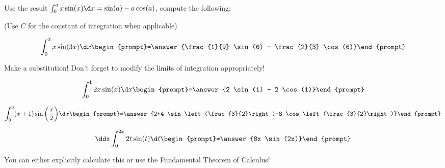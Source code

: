 \documentclass{ximera}
\author{Jim Talamo}
\begin{document}
\begin{exercise}
Use the result $ \int_0^a x \sin(x) \d x = \sin(a)-a \cos(a)$, compute the following:

\begin{prompt} (Use $C$ for the constant of integration when applicable) \end{prompt}

\[
 \int_0^2 x \sin(3x) \d x \begin{prompt}=\answer{\frac{1}{9} \sin(6) -
    \frac{2}{3} \cos(6)}\end{prompt}
\]

\begin{hint}
Make a substitution!  Don't forget to modify the limits of integration appropriately!
\end{hint}

\[
 \int_0^1 2x \sin(x) \d x \begin{prompt}=\answer{2 \sin(1) - 2 \cos(1)}\end{prompt}
\]

\[
 \int_0^3 (x+1) \sin\bigg(\frac{x}{2}\bigg) \d x \begin{prompt}=\answer{2+4 \sin\left(\frac{3}{2}\right)-8 \cos\left(\frac{3}{2}\right)}\end{prompt}
 \]

\[
\ddx  \int_0^{2x} 2t \sin(t) \d t  \begin{prompt}=\answer{8x \sin(2x)}\end{prompt}
\]
\begin{hint}
You can either explicitly calculate this or use the Fundamental Theorem of Calculus!
\end{hint}

\end{exercise}
\end{document}
